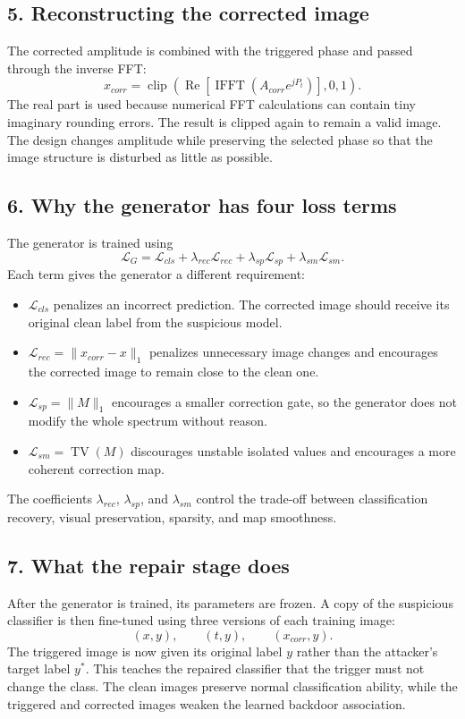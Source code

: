 \documentclass[11pt]{article}
\begin{document}
\subsection*{5. Reconstructing the corrected image}
The corrected amplitude is combined with the triggered phase and passed through
the inverse FFT:
\begin{equation}
    x_{corr}=\operatorname{clip}\left(\operatorname{Re}\left[
    \operatorname{IFFT}\left(A_{corr}e^{jP_t}\right)\right],0,1\right).
\end{equation}
The real part is used because numerical FFT calculations can contain tiny
imaginary rounding errors. The result is clipped again to remain a valid image.
The design changes amplitude while preserving the selected phase so that the
image structure is disturbed as little as possible.

\subsection*{6. Why the generator has four loss terms}
The generator is trained using
\begin{equation}
    \mathcal{L}_G=\mathcal{L}_{cls}
    +\lambda_{rec}\mathcal{L}_{rec}
    +\lambda_{sp}\mathcal{L}_{sp}
    +\lambda_{sm}\mathcal{L}_{sm}.
\end{equation}
Each term gives the generator a different requirement:
\begin{itemize}
    \item $\mathcal{L}_{cls}$ penalizes an incorrect prediction. The corrected
    image should receive its original clean label from the suspicious model.
    \item $\mathcal{L}_{rec}=\|x_{corr}-x\|_1$ penalizes unnecessary image
    changes and encourages the corrected image to remain close to the clean one.
    \item $\mathcal{L}_{sp}=\|M\|_1$ encourages a smaller correction gate, so
    the generator does not modify the whole spectrum without reason.
    \item $\mathcal{L}_{sm}=\operatorname{TV}(M)$ discourages unstable isolated
    values and encourages a more coherent correction map.
\end{itemize}
The coefficients $\lambda_{rec}$, $\lambda_{sp}$, and $\lambda_{sm}$ control
the trade-off between classification recovery, visual preservation, sparsity,
and map smoothness.

\subsection*{7. What the repair stage does}
After the generator is trained, its parameters are frozen. A copy of the
suspicious classifier is then fine-tuned using three versions of each training
image:
\begin{equation}
    (x,y),\qquad (t,y),\qquad (x_{corr},y).
\end{equation}
The triggered image is now given its original label $y$ rather than the
attacker's target label $y^*$. This teaches the repaired classifier that the
trigger must not change the class. The clean images preserve normal
classification ability, while the triggered and corrected images weaken the
learned backdoor association.
\end{document}
